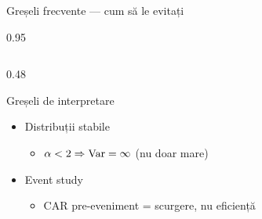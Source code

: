 \documentclass[9pt, aspectratio=169, t]{beamer}
\begin{document}
\begin{frame}{Greșeli frecvente --- cum să le evitați}
\begin{cminipage}{0.95\textwidth}
\begin{columns}[T]
\begin{column}{0.48\textwidth}
\begin{alertblock}{Greșeli de interpretare}
\begin{itemize}
\begin{itemize}
    \end{itemize}
    \item Distribuții stabile
    \begin{itemize}\setlength{\itemsep}{0pt}
        \item $\alpha < 2 \Rightarrow \text{Var} = \infty$ (nu doar mare)
    \end{itemize}
    \item Event study
    \begin{itemize}\setlength{\itemsep}{0pt}
        \item CAR pre-eveniment = scurgere, nu eficiență
    \end{itemize}
\end{itemize}
\end{alertblock}
\end{column}
\end{columns}
\end{cminipage}
\end{frame}
\end{document}
